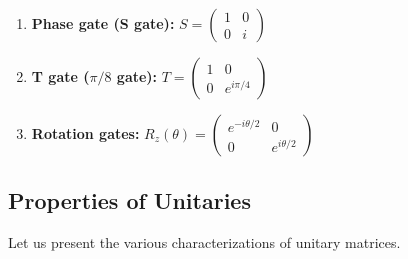 \begin{example}
\begin{enumerate}
Note: $H^2 = I$ (Hadamard is self-inverse).

\item \textbf{Phase gate (S gate):} $S = \begin{pmatrix} 1 & 0 \\ 0 & i \end{pmatrix}$

\item \textbf{T gate ($\pi/8$ gate):} $T = \begin{pmatrix} 1 & 0 \\ 0 & e^{i\pi/4} \end{pmatrix}$

\item \textbf{Rotation gates:}
$R_z(\theta) = \begin{pmatrix} e^{-i\theta/2} & 0 \\ 0 & e^{i\theta/2} \end{pmatrix}$
\end{enumerate}
\end{example}






\subsection{Properties of Unitaries}
Let us present the various characterizations of unitary matrices.

